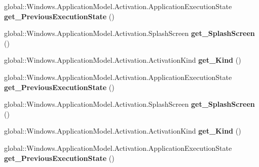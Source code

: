 \begin{DoxyCompactItemize}
global\+::\+Windows.\+Application\+Model.\+Activation.\+Application\+Execution\+State {\bfseries get\+\_\+\+Previous\+Execution\+State} ()
\item 
\mbox{\label{interface_windows_1_1_application_model_1_1_activation_1_1_i_activated_event_args_a782c2a15d296b0422175e334ea04039c}} 
global\+::\+Windows.\+Application\+Model.\+Activation.\+Splash\+Screen {\bfseries get\+\_\+\+Splash\+Screen} ()
\item 
\mbox{\label{interface_windows_1_1_application_model_1_1_activation_1_1_i_activated_event_args_ae3df998eda324e7f240cbb1506811f7f}} 
global\+::\+Windows.\+Application\+Model.\+Activation.\+Activation\+Kind {\bfseries get\+\_\+\+Kind} ()
\item 
\mbox{\label{interface_windows_1_1_application_model_1_1_activation_1_1_i_activated_event_args_aa734f32f7c7386e843c56f98215083bf}} 
global\+::\+Windows.\+Application\+Model.\+Activation.\+Application\+Execution\+State {\bfseries get\+\_\+\+Previous\+Execution\+State} ()
\item 
\mbox{\label{interface_windows_1_1_application_model_1_1_activation_1_1_i_activated_event_args_a782c2a15d296b0422175e334ea04039c}} 
global\+::\+Windows.\+Application\+Model.\+Activation.\+Splash\+Screen {\bfseries get\+\_\+\+Splash\+Screen} ()
\item 
\mbox{\label{interface_windows_1_1_application_model_1_1_activation_1_1_i_activated_event_args_ae3df998eda324e7f240cbb1506811f7f}} 
global\+::\+Windows.\+Application\+Model.\+Activation.\+Activation\+Kind {\bfseries get\+\_\+\+Kind} ()
\item 
\mbox{\label{interface_windows_1_1_application_model_1_1_activation_1_1_i_activated_event_args_aa734f32f7c7386e843c56f98215083bf}} 
global\+::\+Windows.\+Application\+Model.\+Activation.\+Application\+Execution\+State {\bfseries get\+\_\+\+Previous\+Execution\+State} ()

\end{DoxyCompactItemize}
